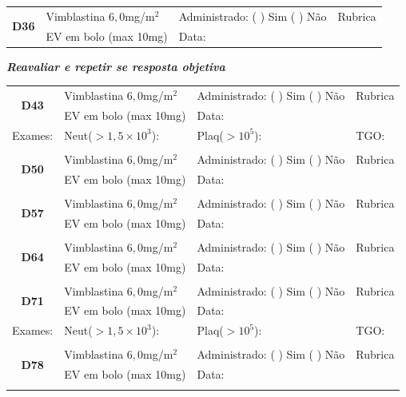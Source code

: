 \documentclass[11pt,a4paper,oldfontcommands]{memoir}
\begin{document}
\begin{center}
\begin{table}[H]
\begin{tabular}{p{1.3cm}p{5cm}|p{5cm}|p{3cm}}
    \hline
    \multicolumn{1}{c|}{\multirow{2}{*}{\textbf{D36}}}&{Vimblastina \(6,0\)mg/m\(^2\)}&{Administrado: (  ) Sim (  ) Não}&{Rubrica}\\
    \multicolumn{1}{c|}{}&{EV em bolo (max 10mg)}&{Data:}&\\
    \hline
    \end{tabular}
    \end{table}
\textbf{\textit{Reavaliar e repetir se resposta objetiva}}
\begin{table}[H]   
    \begin{tabular}{p{1.3cm}p{5cm}|p{5cm}|p{3cm}}
    \hline
       \multicolumn{1}{c|}{\multirow{2}{*}{\textbf{D43}}}&{Vimblastina \(6,0\)mg/m\(^2\)}&{Administrado: (  ) Sim (  ) Não}&{Rubrica}\\
    \multicolumn{1}{c|}{}&{EV em bolo (max 10mg)}&{Data:}&\\
    \hline
    {Exames:}&{Neut(\(>1,5\times10^3\)):}&{Plaq(\(>10^5\)):}&{TGO:}
    \\
    \hline
    \\
    \hline
    \multicolumn{1}{c|}{\multirow{2}{*}{\textbf{D50}}}&{Vimblastina \(6,0\)mg/m\(^2\)}&{Administrado: (  ) Sim (  ) Não}&{Rubrica}\\
    \multicolumn{1}{c|}{}&{EV em bolo (max 10mg)}&{Data:}&\\
    \hline
    \\
    \hline
    \multicolumn{1}{c|}{\multirow{2}{*}{\textbf{D57}}}&{Vimblastina \(6,0\)mg/m\(^2\)}&{Administrado: (  ) Sim (  ) Não}&{Rubrica}\\
    \multicolumn{1}{c|}{}&{EV em bolo (max 10mg)}&{Data:}&\\
    \hline
    \\
    \hline
    \multicolumn{1}{c|}{\multirow{2}{*}{\textbf{D64}}}&{Vimblastina \(6,0\)mg/m\(^2\)}&{Administrado: (  ) Sim (  ) Não}&{Rubrica}\\
    \multicolumn{1}{c|}{}&{EV em bolo (max 10mg)}&{Data:}&\\
    \hline
    \\
    \hline
    \multicolumn{1}{c|}{\multirow{2}{*}{\textbf{D71}}}&{Vimblastina \(6,0\)mg/m\(^2\)}&{Administrado: (  ) Sim (  ) Não}&{Rubrica}\\
    \multicolumn{1}{c|}{}&{EV em bolo (max 10mg)}&{Data:}&\\
    \hline
    {Exames:}&{Neut(\(>1,5\times10^3\)):}&{Plaq(\(>10^5\)):}&{TGO:}
    \\
    \hline\\
    \hline
    \multicolumn{1}{c|}{\multirow{2}{*}{\textbf{D78}}}&{Vimblastina \(6,0\)mg/m\(^2\)}&{Administrado: (  ) Sim (  ) Não}&{Rubrica}\\
    \multicolumn{1}{c|}{}&{EV em bolo (max 10mg)}&{Data:}&\\
    \hline
    \\
\end{tabular}
\end{table}


\end{center}
\end{document}
